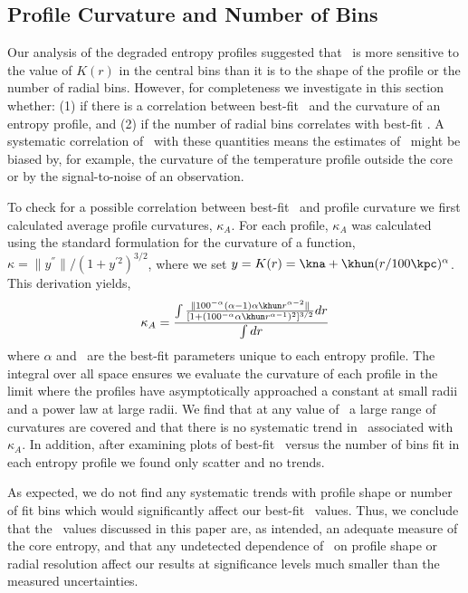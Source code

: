 \documentclass{emulateapj}
\begin{document}
\subsection{Profile Curvature and Number of Bins}
\label{sec:curve}

Our analysis of the degraded entropy profiles suggested that \kna\ is
more sensitive to the value of $K(r)$ in the central bins than it is
to the shape of the profile or the number of radial bins. However, for
completeness we investigate in this section whether: (1) if there is a
correlation between best-fit \kna\ and the curvature of an entropy
profile, and (2) if the number of radial bins correlates with best-fit
\kna. A systematic correlation of \kna\ with these quantities means
the estimates of \kna\ might be biased by, for example, the curvature
of the temperature profile outside the core or by the signal-to-noise
of an observation.

To check for a possible correlation between best-fit \kna\ and profile
curvature we first calculated average profile curvatures,
$\kappa_A$. For each profile, $\kappa_A$ was calculated using the
standard formulation for the curvature of a function, $\kappa =
\|y^{''}\|/(1+y^{'2})^{3/2}$, where we set $y = K(r) =
\kna+\khun(r/100\kpc)^{\alpha}$. This derivation yields,
\begin{equation}
\kappa_A = \frac{\int\frac{\| 100^{-\alpha} (\alpha-1) \alpha \khun
  r^{\alpha-2}\|}{[1+(100^{-\alpha} \alpha \khun
    r^{\alpha-1})^2]^{3/2}} dr}{\int dr}
\end{equation}
where $\alpha$ and \khun\ are the best-fit parameters unique to each
entropy profile. The integral over all space ensures we evaluate the
curvature of each profile in the limit where the profiles have
asymptotically approached a constant at small radii and a power law at
large radii. We find that at any value of \kna\ a large range of
curvatures are covered and that there is no systematic trend in
\kna\ associated with $\kappa_A$. In addition, after examining plots
of best-fit \kna\ versus the number of bins fit in each entropy
profile we found only scatter and no trends.

As expected, we do not find any systematic trends with profile shape
or number of fit bins which would significantly affect our best-fit
\kna\ values. Thus, we conclude that the \kna\ values discussed in
this paper are, as intended, an adequate measure of the core entropy,
and that any undetected dependence of \kna\ on profile shape or radial
resolution affect our results at significance levels much smaller than
the measured uncertainties.
\end{document}
